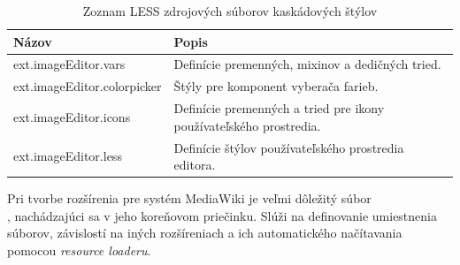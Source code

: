 \begin{table}
	\begin{tabular}{ | m{6cm} | m{6.5cm} | } \hline
		\textbf{Názov} & \textbf{Popis} \\ \hline \hline
		
		ext.imageEditor.vars & Definície premenných, mixinov a dedičných tried. \\\hline
		ext.imageEditor.colorpicker & Štýly pre komponent vyberača farieb. \\\hline
		ext.imageEditor.icons & Definície premenných a tried pre ikony používateľského prostredia. \\\hline
		ext.imageEditor.less & Definície štýlov používateľského prostredia editora. \\\hline
		
		\hline
	\end{tabular}
	\caption{Zoznam LESS zdrojových súborov kaskádových štýlov}
	\label{tab:editor-styles-files}
\end{table}

Pri tvorbe rozšírenia pre systém MediaWiki je veľmi dôležitý súbor \\
, nachádzajúci sa v jeho koreňovom priečinku. Slúži na definovanie umiestnenia súborov, závislostí na iných rozšíreniach a ich automatického načítavania pomocou \textit{resource loaderu}.




